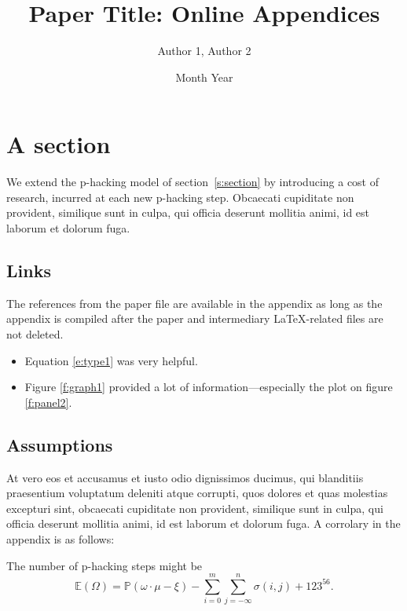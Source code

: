 \documentclass[letterpaper,12pt,leqno]{article}
\begin{document}
\title{Paper Title: Online Appendices}
\author{Author 1, Author 2}
\date{Month Year}

\begin{titlepage}
\maketitle
\tableofcontents
\end{titlepage}


\section{A section}\label{a:appendix1}

We extend the p-hacking model of section~\ref{s:section} by introducing a cost of research, incurred at each new p-hacking step. Obcaecati cupiditate non provident, similique sunt in culpa, qui officia deserunt mollitia animi, id est laborum et dolorum fuga. 

\subsection{Links} 

The references from the paper file are available in the appendix as long as the appendix is compiled after the paper and intermediary LaTeX-related files are not deleted.

\begin{itemize}    
    \item Equation \ref{e:type1} was very helpful.
    \item Figure \ref{f:graph1} provided a lot of information---especially the plot on figure \ref{f:panel2}. 
\end{itemize}  

\subsection{Assumptions} 

At vero eos et accusamus et iusto odio dignissimos ducimus, qui blanditiis praesentium voluptatum deleniti atque corrupti, quos dolores et quas molestias excepturi sint, obcaecati cupiditate non provident, similique sunt in culpa, qui officia deserunt mollitia animi, id est laborum et dolorum fuga. A corrolary in the appendix is as follows:

\begin{corollary} The number of p-hacking steps might be
\begin{equation*}
\mathbb{E}(\Omega) = \mathbb{P}(\omega\cdot \mu - \xi) - \sum_{i=0}^{m}\sum_{j=-\infty}^{n} \sigma(i,j) + 123^{56}.
\end{equation*}\end{corollary}
\end{document}
